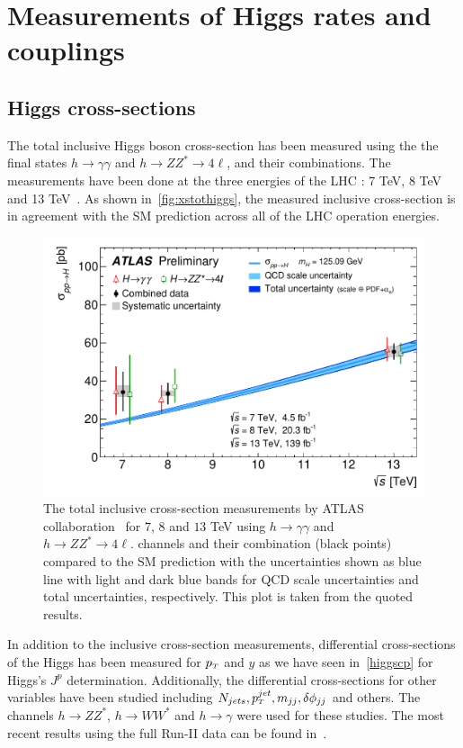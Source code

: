 \section{Measurements of Higgs rates and couplings \label{sec:Higgscoupl} }
\subsection{Higgs cross-sections}
\par The total inclusive Higgs boson cross-section has been measured using the the final states $ h \to \gamma \gamma$ and $ h\to Z Z^* \to 4 \ell$, and their combinations.  The measurements have been done at the three energies of the LHC : 7 TeV, 8 TeV ~\cite{CMS:2015zpx} and 13 TeV~\cite{CMS:2018gwt,CMS:2021ugl,ATLAS:2019mju}. As shown in~\autoref{fig:xstothiggs}, the measured inclusive cross-section is in agreement with the SM prediction across all of the LHC operation energies.
\begin{figure}[htb!]
	\begin{center}
		\includegraphics[height=0.35\textheight]{figures/Higgs_results/fig_01}
		\caption{The total inclusive cross-section measurements by ATLAS collaboration~\cite{ATLAS:2019mju} for $7$, $8$ and $13$ TeV using  $ h \to \gamma \gamma$ and $ h\to Z Z^* \to 4 \ell$. channels and their combination (black points) compared to the SM prediction with the  uncertainties shown as blue line with light and dark blue bands for QCD scale uncertainties and total uncertainties, respectively. This plot is taken from the quoted results.}	
		\label{fig:xstothiggs}
	\end{center}
\end{figure}
\par In addition to the inclusive cross-section measurements,  differential cross-sections of the Higgs has been measured for $p_{\scriptscriptstyle T}$ and  $y$ as we have seen in~\autoref{higgscp} for Higgs's $J^p$ determination. Additionally,  the differential cross-sections for other variables have been studied including $N_{jets}, p_{\scriptscriptstyle T}^{jet}, m_{jj},\delta \phi_{jj}$ and others.  The channels $ h \to ZZ^*$, $h \to W W^*$ and $ h \to \gamma$ were used for these studies. The most recent results using the full Run-II data can be found in~\cite{CMS:2018gwt,ATLAS:2019jst,ATLAS:2019mju,CMS:2019chr}.  \\
